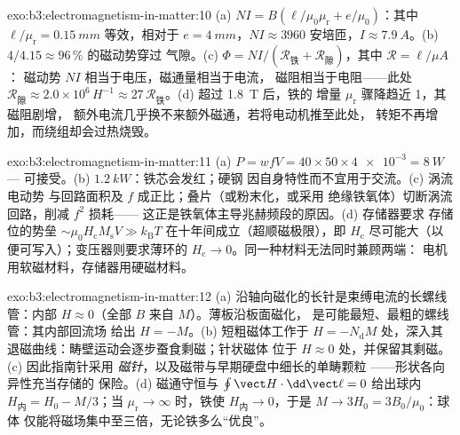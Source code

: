 \begin{solution}{exo:b3:electromagnetism-in-matter:10}
(a) $NI = B(\ell/\mu_0\mu_{\text{r}} + e/\mu_0)$：其中
$\ell/\mu_{\text{r}} = \qty{0.15}{mm}$ 等效，相对于 $e =
\qty{4}{mm}$，$NI \approx 3960$ 安培匝，$I \approx
\qty{7.9}{A}$。(b) $4/4.15 \approx 96\,\%$ 的磁动势穿过
气隙。(c) $\Phi = NI/(\mathcal R_{\text{铁}} +
\mathcal R_{\text{隙}})$，其中 $\mathcal R = \ell/\mu A$：
磁动势 $NI$ 相当于电压，磁通量相当于电流，
磁阻相当于电阻——此处 $\mathcal R_{\text{隙}}
\approx 2.0\times10^{6}\,\unit{H^{-1}} \approx
27\,\mathcal R_{\text{铁}}$。(d) 超过 \qty{1.8}{T} 后，铁的
增量 $\mu_{\text{r}}$ 骤降趋近 1，其磁阻剧增，
额外电流几乎换不来额外磁通，若将电动机推至此处，
转矩不再增加，而绕组却会过热烧毁。
\end{solution}

\begin{solution}{exo:b3:electromagnetism-in-matter:11}
(a) $P = wfV = 40\times50\times\num{4e-3} = \qty{8}{W}$ ---
可接受。(b) $\qty{1.2}{kW}$：铁芯会发红；硬钢
因自身特性而不宜用于交流。(c) 涡流电动势
与回路面积及 $f$ 成正比；叠片（或粉末化，或采用
绝缘铁氧体）切断涡流回路，削减 $f^2$ 损耗——
这正是铁氧体主导兆赫频段的原因。(d) 存储器要求
存储位的势垒 $\sim\mu_0H_{\text{c}}M_{\text{s}}V \gg
k_{\text{B}}T$ 在十年间成立（超顺磁极限），即
$H_{\text{c}}$ 尽可能大（以便可写入）；变压器则要求薄环的
$H_{\text{c}} \to 0$。同一种材料无法同时兼顾两端：
电机用软磁材料，存储器用硬磁材料。
\end{solution}

\begin{solution}{exo:b3:electromagnetism-in-matter:12}
(a) 沿轴向磁化的长针是束缚电流的长螺线管：内部
$H \approx 0$（全部 $B$ 来自 $M$）。薄板沿板面磁化，
是可能最短、最粗的螺线管：其内部回流场
给出 $H = -M$。(b)
短粗磁体工作于 $H = -N_{\text{d}}M$ 处，深入其
退磁曲线：畴壁运动会逐步蚕食剩磁；针状磁体
位于 $H \approx 0$ 处，并保留其剩磁。(c) 因此指南针采用
\emph{磁针}，以及磁带与早期硬盘中细长的单畴颗粒
——形状各向异性充当存储的
保险。(d) 磁通守恒与 $\oint\vect H\cdot
\dd\vect\ell = 0$ 给出球内 $H_{\text{内}} =
H_0 - M/3$；当 $\mu_{\text{r}}\to\infty$ 时，铁使
$H_{\text{内}}\to0$，于是 $M \to 3H_0 = 3B_0/\mu_0$：球体
仅能将磁场集中至三倍，无论铁多么“优良”。
\end{solution}

